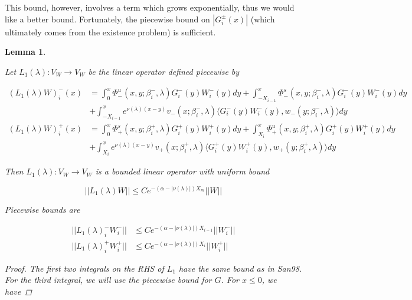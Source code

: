 \documentclass[12pt]{article}
\newtheorem{lemma}{Lemma}
\begin{document}
This bound, however, involves a term which grows exponentially, thus we would like a better bound. Fortunately, the piecewise bound on $|G_i^\pm(x)|$ (which ultimately comes from the existence problem) is sufficient.


\begin{lemma}\label{L1better}

Let $L_1(\lambda): V_W \rightarrow V_W$ be the linear operator defined piecewise by

\begin{align*}
(L_1(\lambda)W)_i^-(x) &= \int_0^x \Phi^u_-(x, y; \beta_i^-, \lambda) G_i^-(y)W_i^-(y) dy + \int_{-X_{i-1}}^x \Phi^s_-(x, y; \beta_i^-, \lambda) G_i^-(y)W_i^-(y) dy \\
&+ \int_{-X_{i-1}}^x 
e^{\nu(\lambda)(x-y)} v_-(x; \beta_i^-, \lambda) \langle G_i^-(y)W_i^-(y), w_-(y; \beta_i^-, \lambda) \rangle dy \\
(L_1(\lambda)W)_i^+(x) &= \int_0^x \Phi^s_+(x, y; \beta_i^+, \lambda) G_i^+(y) W_i^+(y) dy + \int_{X_i}^x \Phi^u_+(x, y; \beta_i^+, \lambda) G_i^+(y) W_i^+(y) dy \\
&+ \int_{X_i}^x e^{\nu(\lambda)(x-y)} v_+(x; \beta_i^+, \lambda) \langle G_i^+(y)W_i^+(y), w_+(y; \beta_i^+, \lambda) \rangle dy
\end{align*}

Then $L_1(\lambda): V_W \rightarrow V_W$ is a bounded linear operator with uniform bound

\begin{equation}\label{L1bound2}
||L_1(\lambda)W|| \leq C e^{-(\alpha -|\nu(\lambda)|)X_m} ||W||
\end{equation}

Piecewise bounds are

\begin{align*}
||L_1(\lambda)_i^- W_i^-|| &\leq C e^{-(\alpha -|\nu(\lambda)|)X_{i-1}} ||W_i^-|| \\
||L_1(\lambda)_i^+ W_i^+|| &\leq C e^{-(\alpha -|\nu(\lambda)|)X_i} ||W_i^+||
\end{align*}

\begin{proof}
The first two integrals on the RHS of $L_1$ have the same bound as in San98. For the third integral, we will use the piecewise bound for $G$. For $x \leq 0$, we have


\end{proof}
\end{lemma}
\end{document}
